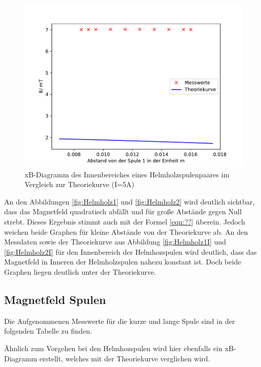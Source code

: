 \begin{figure}[H]
  \centering
  \includegraphics{Helmholz2I.pdf}
  \caption{xB-Diagramm des Innenbereiches eines
  Helmholzspulenpaares im Vergleich zur Theoriekurve
  (I=5A)}
  \label{fif:Helmholz2I}
\end{figure}
\noindent An den Abbildungen \ref{fig:Helmholz1}
und \ref{fig:Helmholz2} wird deutlich sichtbar, dass
das Magnetfeld quadratisch abfällt und für große Abstände
gegen Null strebt. Dieses Ergebnis stimmt auch mit
der Formel \ref{eqn:??} überein. Jedoch weichen beide
Graphen für kleine Abstände von der Theoriekurve ab.
\noindent An den Messdaten sowie der Theoriekurve aus
Abbildung \ref{fig:Helmholz1I} und \ref{fig:Helmholz2I}
für den Innenbereich der Helmhozspulen wird deutlich, dass
das Magnetfeld in Inneren der Helmholzspulen
nahezu konstant ist. Doch beide Graphen liegen
deutlich unter der Theoriekurve.


\subsection{Magnetfeld Spulen}
\noindent Die Aufgenommenen Messwerte für die kurze und lange
Spule sind in der folgenden Tabelle zu finden.

Ähnlich zum Vorgehen bei den Helmhozspulen wird hier
ebenfalls ein xB-Diagramm erstellt, welches mit
der Theoriekurve verglichen wird.

